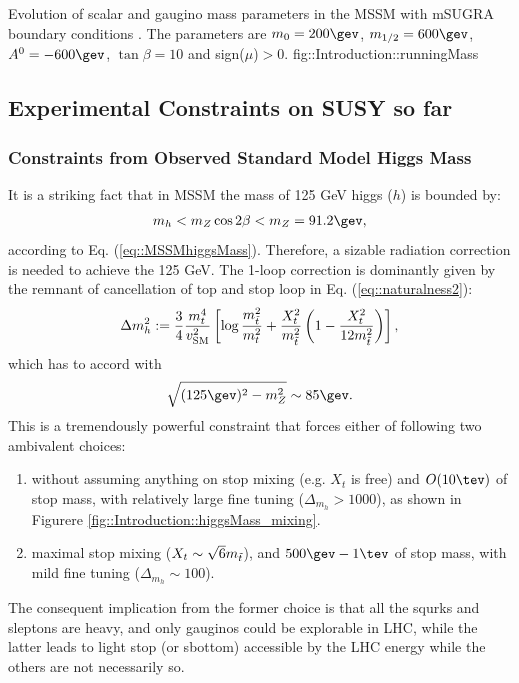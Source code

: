 {Evolution of scalar and gaugino mass parameters in the MSSM with mSUGRA boundary conditions \cite{SUSYPrimer}. The parameters are $m_0=200 \gev$, $m_{1/2}=600 \gev$, $A^0=-600\gev$, $\tan{\beta}=10$ and sign($\mu$)$>0$.}
{fig::Introduction::runningMass}



\subsection{Experimental Constraints on SUSY so far} 
\subsubsection{Constraints from Observed Standard Model Higgs Mass}
It is a striking fact that in MSSM the mass of 125 GeV higgs ($h$) is bounded by:
\begin{align}
m_{h} < m_Z \cos{2\beta} < m_Z = 91.2 \gev,
\end{align}
according to Eq. (\ref{eq::MSSMhiggsMass}).
Therefore, a sizable radiation correction is needed to achieve the 125 GeV.
The 1-loop correction is dominantly given by the remnant of cancellation of top and stop loop in Eq. (\ref{eq::naturalness2}):
\begin{align}
\Delta m_h^2 := \frac{3}{4} \frac{m_t^4}{v_{\mathrm{SM}}^2} \left[ \log{\frac{m_{\tilde{t}}^2}{m_t^2}} + \frac{X_t^2}{m_{\tilde{t}}^2} \left(1-\frac{X_t^2}{12m_{\tilde{t}}^2} \right)  \right],
\end{align}
which has to accord with 
\begin{align}
\sqrt{(125\gev)^2 - m_Z^2} \sim 85\gev.
\end{align}
This is a tremendously powerful constraint that forces either of following two ambivalent choices:
\begin{enumerate}
\item without assuming anything on stop mixing (e.g. $X_t$ is free) and $O(10\tev)$ of stop mass, with relatively large fine tuning ($\Delta_{m_{h}}>1000$), as shown in Figurere \ref{fig::Introduction::higgsMass_mixing}. 
\item maximal stop mixing ($X_t \sim \sqrt{6}m_{\tilde{t}}$), and $500\gev-1\tev$ of stop mass, with mild fine tuning ($\Delta_{m_{h}} \sim 100$).
\end{enumerate}
The consequent implication from the former choice is that all the squrks and sleptons are heavy, and only gauginos could be explorable in LHC,
while the latter leads to light stop (or sbottom) accessible by the LHC energy while the others are not necessarily so. \\

